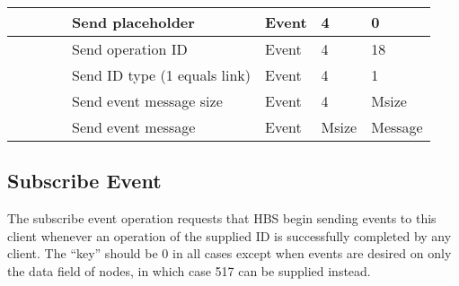 \begin{tabular}{|p{1.2in}|p{.4in}|p{.4in}|p{.5in}|p{1.2in}|p{.4in}|p{.4in}|p{.5in} |}
                  &        &       &       & Send placeholder  & Event  &   4   &   0    \\  \hline
                  &        &       &       & Send operation 
                                             ID           & Event  &   4   &  18   \\ \hline
                  &        &       &       & Send ID type (1 equals link)     & Event  &   4   &  1    \\ \hline
                  &        &       &       & Send event message
                                                  size    & Event  &   4   &  Msize \\ \hline
                  &        &       &       & Send event message
                                                          & Event  & Msize & Message  \\ \hline
\end{tabular}
\normalsize
\bigskip




\newpage
\subsection{Subscribe Event}

The  subscribe event operation requests that HBS begin sending events
to this client whenever an operation of the supplied ID is successfully
completed by any client.  The ``key'' should be 0 in all cases except when 
events are desired on only the data field of nodes, in which case 517 can
be supplied instead. 

